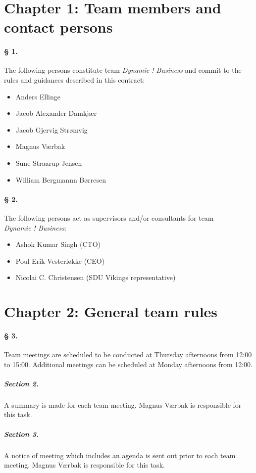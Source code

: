 \documentclass{article}
\begin{document}
\section*{Chapter 1: Team members and contact persons}
\paragraph{§ 1.}
The following persons constitute team \emph{Dynamic ! Business} and commit to the rules and guidances described in this contract:
\begin{itemize}
\item Anders Ellinge
\item Jacob Alexander Damkjær
\item Jacob Gjervig Strømvig
\item Magnus Værbak
\item Sune Straarup Jensen
\item William Bergmannn Børresen
\end{itemize}

\paragraph{§ 2.}
The following persons act as supervisors and/or consultants for team \\ \emph{Dynamic ! Business}:
\begin{itemize}
\item Ashok Kumar Singh (CTO)
\item Poul Erik Vesterløkke (CEO)
\item Nicolai C. Christensen (SDU Vikings representative)
\end{itemize}

\section*{Chapter 2: General team rules}
\paragraph{§ 3.}
Team meetings are scheduled to be conducted at Thursday afternoons from 12:00 to 15:00. Additional meetings can be scheduled at Monday afternoons from 12:00.
\subparagraph{Section 2.} 
A summary is made for each team meeting. Magnus Værbak is responsible for this task.
\subparagraph{Section 3.}
A notice of meeting which includes an agenda is sent out prior to each team meeting. Magnus Værbak is responsible for this task. 
\end{document}
